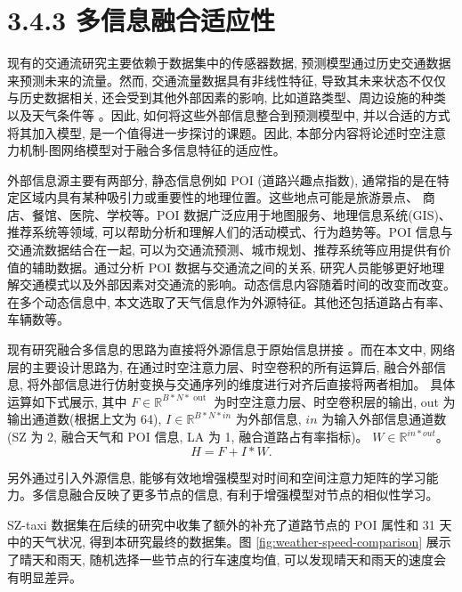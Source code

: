 \section*{3.4.3 多信息融合适应性}

现有的交通流研究主要依赖于数据集中的传感器数据, 预测模型通过历史交通数据来预测未来的流量。然而, 交通流量数据具有非线性特征, 导致其未来状态不仅仅与历史数据相关, 还会受到其他外部因素的影响, 比如道路类型、周边设施的种类以及天气条件等 \parencite{2019_Zhang_Flow_prediction_in_spatio_temporal_networks_based_on_multitask_deep_learning}。因此, 如何将这些外部信息整合到预测模型中, 并以合适的方式将其加入模型, 是一个值得进一步探讨的课题。因此, 本部分内容将论述时空注意力机制-图网络模型对于融合多信息特征的适应性。

外部信息源主要有两部分, 静态信息例如 POI (道路兴趣点指数), 通常指的是在特定区域内具有某种吸引力或重要性的地理位置。这些地点可能是旅游景点、 商店、餐馆、医院、学校等。POI 数据广泛应用于地图服务、地理信息系统(GIS)、 推荐系统等领域, 可以帮助分析和理解人们的活动模式、行为趋势等。POI 信息与交通流数据结合在一起, 可以为交通流预测、城市规划、推荐系统等应用提供有价值的辅助数据。通过分析 POI 数据与交通流之间的关系, 研究人员能够更好地理解交通模式以及外部因素对交通流的影响。动态信息内容随着时间的改变而改变。在多个动态信息中, 本文选取了天气信息作为外源特征。其他还包括道路占有率、车辆数等。

现有研究融合多信息的思路为直接将外源信息于原始信息拼接 \parencite{2023_胡晓荣_基于图神经网络的路网短时交通流预测算法研究}。而在本文中, 网络层的主要设计思路为, 在通过时空注意力层、时空卷积的所有运算后, 融合外部信息, 将外部信息进行仿射变换与交通序列的维度进行对齐后直接将两者相加。 具体运算如下式展示, 其中 \({F} \in  {\mathbb{R}}^{{B} * {N} * \text{ out }}\) 为时空注意力层、时空卷积层的输出, out 为输出通道数(根据上文为 64), \({I} \in  {\mathbb{R}}^{{B} * {N} * {{in}}}\) 为外部信息, \({{in}}\) 为输入外部信息通道数(SZ 为 2, 融合天气和 POI 信息, LA 为 1, 融合道路占有率指标)。 \({W} \in  {\mathbb{R}}^{{{in}} * {{out}}}\)。
\begin{equation}
{H} = {F} + {I} * {W}.
\end{equation}

另外通过引入外源信息, 能够有效地增强模型对时间和空间注意力矩阵的学习能力。多信息融合反映了更多节点的信息, 有利于增强模型对节点的相似性学习。

SZ-taxi 数据集在后续的研究中收集了额外的补充了道路节点的 POI 属性和 31 天中的天气状况, 得到本研究最终的数据集。图 \ref{fig:weather-speed-comparison} 展示了晴天和雨天, 随机选择一些节点的行车速度均值, 可以发现晴天和雨天的速度会有明显差异。

